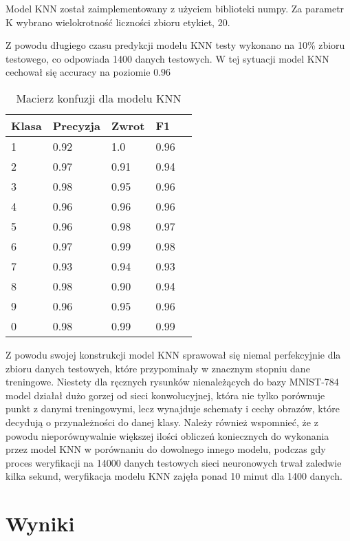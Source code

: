 \documentclass{article}
\begin{document}
Model KNN został zaimplementowany z użyciem biblioteki numpy. Za parametr K 
wybrano wielokrotność liczności zbioru etykiet, 20.

Z powodu długiego czasu predykcji modelu KNN testy wykonano na 10\% zbioru testowego, co odpowiada 1400 danych testowych.
W tej sytuacji model KNN cechował się accuracy na poziomie $0.96$

\begin{table}[H]
    \centering
    \begin{tabular}{|l|l|l|l|l|}
    \hline
    Klasa & Precyzja & Zwrot & F1 \\
    \hline
    1     & 0.92     & 1.0   & 0.96 \\
    2     & 0.97     & 0.91  & 0.94 \\
    3     & 0.98     & 0.95  & 0.96 \\
    4     & 0.96     & 0.96  & 0.96 \\
    5     & 0.96     & 0.98  & 0.97 \\
    6     & 0.97     & 0.99  & 0.98 \\
    7     & 0.93     & 0.94  & 0.93 \\
    8     & 0.98     & 0.90  & 0.94 \\
    9     & 0.96     & 0.95  & 0.96 \\
    0     & 0.98     & 0.99  & 0.99 \\
    \hline
    \end{tabular}
    \caption{Macierz konfuzji dla modelu KNN}
\end{table}

Z powodu swojej konstrukcji model KNN sprawował się niemal perfekcyjnie 
dla zbioru danych testowych, które przypominały w znacznym stopniu 
dane treningowe. Niestety dla ręcznych rysunków nienależących do 
bazy MNIST-784 model działał dużo gorzej od sieci konwolucyjnej, 
która nie tylko porównuje punkt z danymi treningowymi, lecz 
wynajduje schematy i cechy obrazów, które decydują o 
przynależności do danej klasy. Należy również wspomnieć, 
że z powodu nieporównywalnie większej ilości obliczeń 
koniecznych do wykonania przez model KNN w porównaniu 
do dowolnego innego modelu, podczas gdy proces weryfikacji 
na 14000 danych testowych sieci neuronowych trwał zaledwie 
kilka sekund, weryfikacja modelu KNN zajęła ponad 10 minut dla 1400 danych.


\section{Wyniki}
\end{document}

